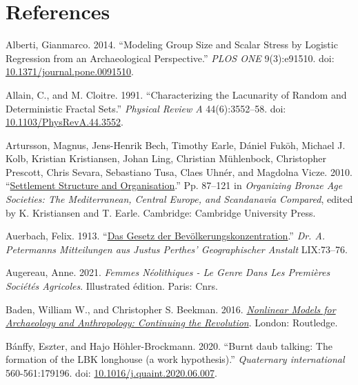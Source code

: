 \documentclass[
  12pt,
]{book}
\newlength{\cslhangindent}
\newlength{\cslentryspacingunit} %
\newenvironment{CSLReferences}[2] %
 {%
  \setlength{\parindent}{0pt}
  \ifodd #1
  \let\oldpar\par
  \def\par{\hangindent=\cslhangindent\oldpar}
  \fi
  \setlength{\parskip}{#2\cslentryspacingunit}
 }%
 {}
\begin{document}
\hypertarget{refs}{}
\begin{CSLReferences}{1}{0}
\hypertarget{references}{%
\chapter*{References}\label{references}}

\leavevmode{}%
Alberti, Gianmarco. 2014. {``Modeling Group Size and Scalar Stress by Logistic Regression from an Archaeological Perspective.''} \emph{PLOS ONE} 9(3):e91510. doi: \href{https://doi.org/10.1371/journal.pone.0091510}{10.1371/journal.pone.0091510}.

\leavevmode{}%
Allain, C., and M. Cloitre. 1991. {``Characterizing the Lacunarity of Random and Deterministic Fractal Sets.''} \emph{Physical Review A} 44(6):3552--58. doi: \href{https://doi.org/10.1103/PhysRevA.44.3552}{10.1103/PhysRevA.44.3552}.

\leavevmode{}%
Artursson, Magnus, Jens-Henrik Bech, Timothy Earle, Dániel Fuköh, Michael J. Kolb, Kristian Kristiansen, Johan Ling, Christian Mühlenbock, Christopher Prescott, Chris Sevara, Sebastiano Tusa, Claes Uhnér, and Magdolna Vicze. 2010. {``\href{https://doi.org/10.1017/CBO9780511779282.005}{Settlement {Structure} and {Organisation}}.''} Pp. 87--121 in \emph{Organizing {Bronze Age Societies}: {The Mediterranean}, {Central Europe}, and {Scandanavia Compared}}, edited by K. Kristiansen and T. Earle. {Cambridge}: {Cambridge University Press}.

\leavevmode{}%
Auerbach, Felix. 1913. {``\href{http://archive.org/details/Auerbach1913}{Das Gesetz der Bevölkerungskonzentration}.''} \emph{Dr. A. Petermanns Mitteilungen aus Justus Perthes' Geographischer Anstalt} LIX:73--76.

\leavevmode{}%
Augereau, Anne. 2021. \emph{Femmes Néolithiques - Le Genre Dans Les Premières Sociétés Agricoles}. Illustrated édition. Paris: Cnrs.

\leavevmode{}%
Baden, William W., and Christopher S. Beekman. 2016. \emph{\href{https://doi.org/10.4324/9781315247908}{Nonlinear Models for Archaeology and Anthropology: Continuing the Revolution}}. London: Routledge.

\leavevmode{}%
Bánffy, Eszter, and Hajo Höhler-Brockmann. 2020. {``Burnt daub talking: The formation of the LBK longhouse (a work hypothesis).''} \emph{Quaternary international} 560-561:179196. doi: \href{https://doi.org/10.1016/j.quaint.2020.06.007}{10.1016/j.quaint.2020.06.007}.


\end{CSLReferences}
\end{document}
